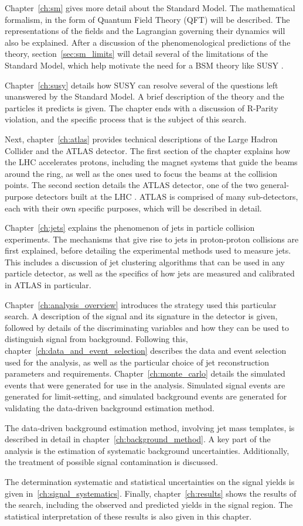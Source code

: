 Chapter~\ref{ch:sm} gives more detail about the Standard Model.
The mathematical formalism, in the form of Quantum Field Theory (QFT) will be described.
The representations of the fields and the Lagrangian governing their dynamics will also be explained.
After a discussion of the phenomenological predictions of the theory, section~\ref{sec:sm_limits} will detail several of the limitations of the Standard Model, which help motivate the need for a BSM theory like SUSY .

Chapter~\ref{ch:susy} details how SUSY can resolve several of the questions left unanswered by the Standard Model.
A brief description of the theory and the particles it predicts is given.
The chapter ends with a discussion of R-Parity violation, and the specific process that is the subject of this search.

Next, chapter~\ref{ch:atlas} provides technical descriptions of the Large Hadron Collider and the ATLAS detector.
The first section of the chapter explains how the LHC accelerates protons, including the magnet systems that guide the beams around the ring, as well as the ones used to focus the beams at the collision points.
The second section details the ATLAS detector, one of the two general-purpose detectors built at the LHC .
ATLAS is comprised of many sub-detectors, each with their own specific purposes, which will be described in detail.

Chapter~\ref{ch:jets} explains the phenomenon of jets in particle collision experiments.
The mechanisms that give rise to jets in proton-proton collisions are first explained, before detailing the experimental methods used to measure jets.
This includes a discussion of jet clustering algorithms that can be used in any particle detector, as well as the specifics of how jets are measured and calibrated in ATLAS in particular.

Chapter~\ref{ch:analysis_overview} introduces the strategy used this particular search.
A description of the signal and its signature in the detector is given, followed by details of the discriminating variables and how they can be used to distinguish signal from background.
Following this, chapter~\ref{ch:data_and_event_selection} describes the data and event selection used for the analysis, as well as the particular choice of jet reconstruction parameters and requirements.
Chapter~\ref{ch:monte_carlo} details the simulated events that were generated for use in the analysis.
Simulated signal events are generated for limit-setting, and simulated background events are generated for validating the data-driven background estimation method.

The data-driven background estimation method, involving jet mass templates, is described in detail in chapter~\ref{ch:background_method}.
A key part of the analysis is the estimation of systematic background uncertainties.
Additionally, the treatment of possible signal contamination is discussed.

The determination systematic and statistical uncertainties on the signal yields is given in~\ref{ch:signal_systematics}.
Finally, chapter~\ref{ch:results} shows the results of the search, including the observed and predicted yields in the signal region.
The statistical interpretation of these results is also given in this chapter.
